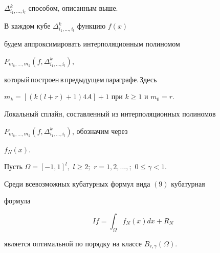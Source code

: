 $\Delta^k_{i_1,\dotsc,i_l}$ способом, описанным выше.


В каждом кубе $\Delta^k_{i_1,\dotsc,i_l} $ функцию $f(x)$


будем аппроксимировать интерполяционным полиномом


$P_{m_k,\dotsc,m_k}(f,\Delta^k_{i_1,\dotsc,i_l}),$


который\,построен\,в\,предыдущем\,параграфе.\,Здесь


$m_k\!=\![(k(l\!+\!r)\!+\!1) 4 A]\!+\!1$ при $k\ge 1$ и $m_0=r.$


Локальный сплайн, составленный из интерполяционных полиномов


$P_{m_k,\dotsc,m_k}(f,\Delta^k_{i_1,\dotsc,i_l})$, обозначим через


$f_N(x).$





\begin{thms}


Пусть $\Omega=[-1,1]^l,$ $l\ge 2;$ $r=1,2,\dotsc,; $ $0 \le \gamma <1.$


Среди всевозможных кубатурных формул вида $(9)$ кубатурная


формула


\begin {equation}


If=\int_{\Omega} f_N(x)dx+R_N


\end {equation}


является оптимальной по порядку на классе $B_{r,\gamma}(\Omega).$


\end{thms}





